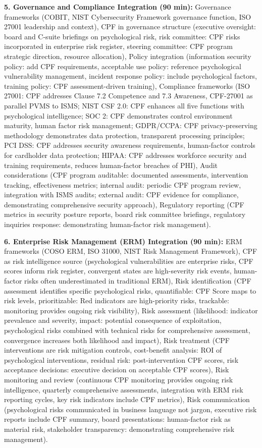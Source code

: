 \documentclass[11pt,a4paper]{article}
\begin{document}
\textbf{5. Governance and Compliance Integration (90 min):} Governance frameworks (COBIT, NIST Cybersecurity Framework governance function, ISO 27001 leadership and context), CPF in governance structure (executive oversight: board and C-suite briefings on psychological risk, risk committee: CPF risks incorporated in enterprise risk register, steering committee: CPF program strategic direction, resource allocation), Policy integration (information security policy: add CPF requirements, acceptable use policy: reference psychological vulnerability management, incident response policy: include psychological factors, training policy: CPF assessment-driven training), Compliance frameworks (ISO 27001: CPF addresses Clause 7.2 Competence and 7.3 Awareness, CPF-27001 as parallel PVMS to ISMS; NIST CSF 2.0: CPF enhances all five functions with psychological intelligence; SOC 2: CPF demonstrates control environment maturity, human factor risk management; GDPR/CCPA: CPF privacy-preserving methodology demonstrates data protection, transparent processing principles; PCI DSS: CPF addresses security awareness requirements, human-factor controls for cardholder data protection; HIPAA: CPF addresses workforce security and training requirements, reduces human-factor breaches of PHI), Audit considerations (CPF program auditable: documented assessments, intervention tracking, effectiveness metrics; internal audit: periodic CPF program review, integration with ISMS audits; external audit: CPF evidence for compliance, demonstrating comprehensive security approach), Regulatory reporting (CPF metrics in security posture reports, board risk committee briefings, regulatory inquiries response: demonstrating human-factor risk management).

\textbf{6. Enterprise Risk Management (ERM) Integration (90 min):} ERM frameworks (COSO ERM, ISO 31000, NIST Risk Management Framework), CPF as risk intelligence source (psychological vulnerabilities are enterprise risks, CPF scores inform risk register, convergent states are high-severity risk events, human-factor risks often underestimated in traditional ERM), Risk identification (CPF assessment identifies specific psychological risks, quantifiable: CPF Score maps to risk levels, prioritizable: Red indicators are high-priority risks, trackable: monitoring provides ongoing risk visibility), Risk assessment (likelihood: indicator prevalence and severity, impact: potential consequence of exploitation, psychological risks combined with technical risks for comprehensive assessment, convergence increases both likelihood and impact), Risk treatment (CPF interventions are risk mitigation controls, cost-benefit analysis: ROI of psychological interventions, residual risk: post-intervention CPF scores, risk acceptance decisions: executive decision on acceptable CPF scores), Risk monitoring and review (continuous CPF monitoring provides ongoing risk intelligence, quarterly comprehensive assessments, integration with ERM risk reporting cycles, key risk indicators include CPF metrics), Risk communication (psychological risks communicated in business language not jargon, executive risk reports include CPF summary, board presentations: human-factor risk as material risk, stakeholder transparency: demonstrating comprehensive risk management).
\end{document}
